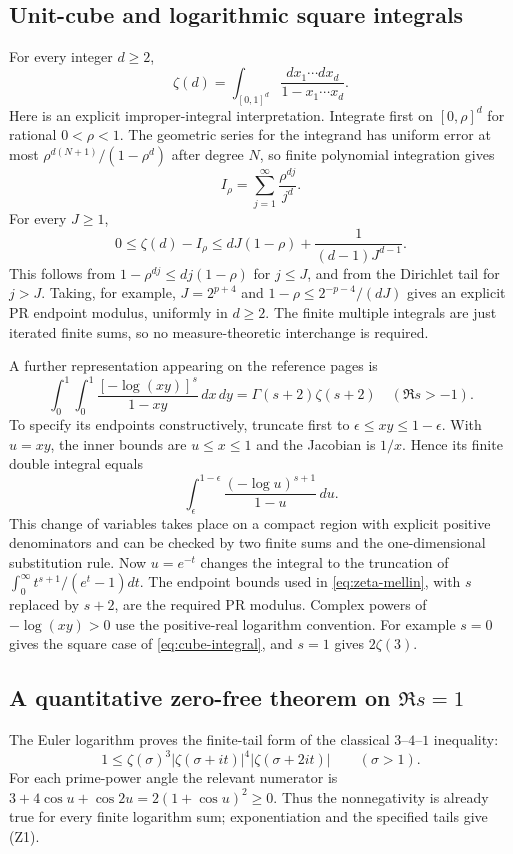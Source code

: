 \subsection{Unit-cube and logarithmic square integrals}
For every integer $d\ge2$,
\begin{equation}
 \boxed{\displaystyle
 \zeta(d)=\int_{[0,1]^d}
                  \frac{dx_1\cdots dx_d}{1-x_1\cdots x_d}.}
 \label{eq:cube-integral}
\end{equation}
Here is an explicit improper-integral interpretation. Integrate first
on $[0,\rho]^d$ for rational $0<\rho<1$. The geometric series for the
integrand has uniform error at most
$\rho^{d(N+1)}/(1-\rho^d)$ after degree $N$, so finite polynomial
integration gives
\[
 I_\rho=\sum_{j=1}^\infty\frac{\rho^{dj}}{j^d}.
\]
For every $J\ge1$,
\[
 0\le\zeta(d)-I_\rho
 \le dJ(1-\rho)+\frac1{(d-1)J^{d-1}}.
\]
This follows from $1-\rho^{dj}\le dj(1-\rho)$ for $j\le J$, and
from the Dirichlet tail for $j>J$. Taking, for example,
$J=2^{p+4}$ and $1-\rho\le2^{-p-4}/(dJ)$ gives an explicit PR endpoint
modulus, uniformly in $d\ge2$. The finite multiple integrals are just
iterated finite sums, so no measure-theoretic interchange is required.

A further representation appearing on the reference pages is
\begin{equation}
 \boxed{\displaystyle
 \int_0^1\!\int_0^1
       \frac{[-\log(xy)]^s}{1-xy}\,dx\,dy
       =\Gamma(s+2)\zeta(s+2)\quad(\Re s>-1).}
 \label{eq:square-log}
\end{equation}
To specify its endpoints constructively, truncate first to
$\epsilon\le xy\le1-\epsilon$. With $u=xy$, the inner bounds are
$u\le x\le1$ and the Jacobian is $1/x$. Hence its finite double
integral equals
\[
 \int_\epsilon^{1-\epsilon}
            \frac{(-\log u)^{s+1}}{1-u}\,du.
\]
This change of variables takes place on a compact region with explicit
positive denominators and can be checked by two finite sums and the
one-dimensional substitution rule. Now $u=e^{-t}$ changes the integral
to the truncation of
$\int_0^\infty t^{s+1}/(e^t-1)dt$. The endpoint bounds used in
\eqref{eq:zeta-mellin}, with $s$ replaced by $s+2$, are the required
PR modulus. Complex powers of $-\log(xy)>0$ use the positive-real
logarithm convention. For example $s=0$ gives the square case of
\eqref{eq:cube-integral}, and $s=1$ gives $2\zeta(3)$.

\subsection{A quantitative zero-free theorem on $\Re s=1$}
\label{subsec:boundary-zeros}
The Euler logarithm proves the finite-tail form of the classical
$3$--$4$--$1$ inequality:
\[
 1\le\zeta(\sigma)^3|\zeta(\sigma+it)|^4
                       |\zeta(\sigma+2it)|\qquad(\sigma>1).
 \tag{Z1}\label{eq:341-repeat}
\]
For each prime-power angle the relevant numerator is
$3+4\cos u+\cos2u=2(1+\cos u)^2\ge0$. Thus the nonnegativity is
already true for every finite logarithm sum; exponentiation and the
specified tails give (Z1).

